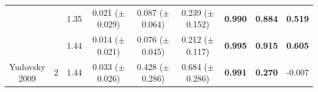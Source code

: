 \begin{subappendices}
\begin{table}[bhp]
\begin{tabular}{|cc|c|ccc|ccc|}
        & & 1.35 & \shortstack{0.021 \\($\pm$ 0.029)} & \shortstack{0.087 \\($\pm$ 0.064)} & \shortstack{0.239 \\($\pm$ 0.152)} & \textbf{0.990} & \textbf{0.884} & \textbf{0.519} \\
        & & 1.44 & \shortstack{0.014 \\($\pm$ 0.021)} & \shortstack{0.076 \\($\pm$ 0.045)} & \shortstack{0.212 \\($\pm$ 0.117)} & \textbf{0.995} & \textbf{0.915} & \textbf{0.605} \\
        \hline
        \shortstack{Yudovsky\\ 2009} & 2 & 1.44 & \shortstack{0.033 \\($\pm$ 0.026)} & \shortstack{0.428 \\($\pm$ 0.286)} & \shortstack{0.684 \\($\pm$ 0.286)} & \textbf{0.991} & \textbf{0.270} & -0.007 \\
        \hline
    \end{tabular}
    \label{ap:forwardsHSIMCr}
\end{table}
\FloatBarrier


\end{subappendices}

